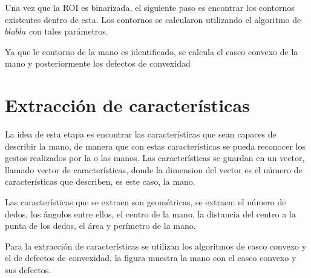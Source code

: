 
Una vez que la ROI es binarizada, el siguiente paso es encontrar los contornos existentes dentro de esta. Los contornos se calcularon utilizando el algoritmo de $blabla$ con tales parámetros.  

Ya que le contorno de la mano es identificado, se calcula el casco convexo de la mano y posteriormente los defectos de convexidad 

\section{Extracci\'on de caracter\'isticas}\label{sec:ExtraccionCaracteristicasSystem}

La idea de esta etapa es encontrar las características que sean capaces de describir la mano, de manera que con estas características se pueda reconocer los gestos realizados por la o las manos.  
Las características se guardan en un vector, llamado vector de características, donde la dimension del vector es el número de características que describen, es este caso, la mano.  

Las características que se extraen son geométricas, se extraen: el n\'umero de dedos, los ángulos entre ellos, el centro de la mano, la distancia del centro a la punta de los dedos, el área y perímetro de la mano. 

Para la extracción de características se utilizan los algoritmos de casco convexo y el de defectos de convexidad, la figura muestra la mano con el casco convexo y sus defectos. 

